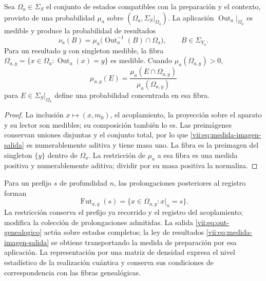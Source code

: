 \begin{proposition}
\label{vii:prop:medida-salida}
Sea \(\Omega_a\in\Sigma_S\) el conjunto de estados compatibles con la
preparación y el contexto, provisto de una probabilidad \(\mu_a\) sobre
\((\Omega_a,\Sigma_S|_{\Omega_a})\).
La aplicación \(\operatorname{Out}_a|_{\Omega_a}\) es medible y produce
la probabilidad de resultados
\begin{equation}
 \nu_a(B)=\mu_a\bigl(\operatorname{Out}_a^{-1}(B)\cap\Omega_a\bigr),
 \qquad B\in\Sigma_{Y_a}.
 \label{vii:eq:medida-imagen-salida}
\end{equation}
Para un resultado \(y\) con singleton medible, la fibra
\(\Omega_{a,y}=\{x\in\Omega_a:\operatorname{Out}_a(x)=y\}\)
es medible. Cuando \(\mu_a(\Omega_{a,y})>0\),
\begin{equation}
 \mu_{a,y}(E)=
 \frac{\mu_a(E\cap\Omega_{a,y})}{\mu_a(\Omega_{a,y})}
 \label{vii:eq:condicionamiento-salida}
\end{equation}
para \(E\in\Sigma_S|_{\Omega_a}\) define una probabilidad concentrada
en esa fibra.
\end{proposition}
\begin{proof}
La inclusión \(x\mapsto(x,m_0)\), el acoplamiento, la proyección sobre
el aparato y su lector son medibles; su composición también lo es.
Las preimágenes conservan uniones disjuntas y el conjunto total, por lo
que \eqref{vii:eq:medida-imagen-salida} es numerablemente aditiva y tiene
masa uno. La fibra es la preimagen del singleton \(\{y\}\) dentro de
\(\Omega_a\). La restricción de \(\mu_a\) a esa fibra es una medida
positiva y numerablemente aditiva; dividir por su masa positiva la normaliza.
\end{proof}

Para un prefijo \(s\) de profundidad \(n\), las prolongaciones posteriores
al registro forman
\[
 \operatorname{Fut}_{a,y}(s)
 =\{x\in\Omega_{a,y}:x|_n=s\}.
\]
La restricción conserva el prefijo ya recorrido y el registro del
acoplamiento; modifica la colección de prolongaciones admitidas. La salida
\eqref{vii:eq:out-genealogico} actúa sobre estados completos; la ley de
resultados \eqref{vii:eq:medida-imagen-salida} se obtiene transportando
la medida de preparación por esa aplicación. La representación por una
matriz de densidad expresa el nivel
estadístico de la realización cuántica y conserva sus condiciones de
correspondencia con las fibras genealógicas.
